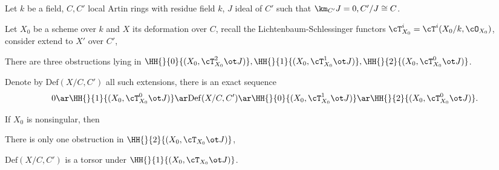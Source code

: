 \documentclass[a4paper, twoside]{article}
\begin{document}
\begin{stp}
	Let $k$ be a field, $C,C'$ local Artin rings with residue field $k$, $J$ ideal of $C'$ such that $\km_{C'}J=0,C'/J\cong C$.
\end{stp}

\begin{thm}
	Let $X_{0}$ be a scheme over $k$ and $X$ its deformation over $C$, recall the Lichtenbaum-Schlessinger functors $\cT_{X_{0}}^{i}=\cT^{i}(X_{0}/k,\cO_{X_{0}})$, consider extend to $X'$ over $C'$,
	\begin{itm}
		\item There are three obstructions lying in $\HH{}{0}{(X_{0},\cT_{X_{0}}^{2}\ot J)},\HH{}{1}{(X_{0},\cT_{X_{0}}^{1}\ot J)},\HH{}{2}{(X_{0},\cT_{X_{0}}^{0}\ot J)}$.
		\item Denote by $\mathrm{Def}(X/C,C')$ all such extensions, there is an exact sequence
		\[
			0\ar\HH{}{1}{(X_{0},\cT_{X_{0}}^{0}\ot J)}\ar \mathrm{Def}(X/C,C')\ar \HH{}{0}{(X_{0},\cT_{X_{0}}^{1}\ot J)}\ar\HH{}{2}{(X_{0},\cT_{X_{0}}^{0}\ot J)}.
		\]
	\end{itm}

	If $X_{0}$ is nonsingular, then
	\begin{itm}
		\item There is only one obstruction in $\HH{}{2}{(X_{0},\cT_{X_{0}}\ot J)}$,
		\item $\mathrm{Def}(X/C,C')$ is a torsor under $\HH{}{1}{(X_{0},\cT_{X_{0}}\ot J)}$.
	\end{itm}
\end{thm}









\ifmain
    
    
\fi
\end{document}
